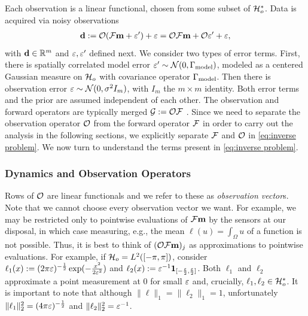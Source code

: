 \documentclass{amsart}
\numberwithin{equation}{section}
\begin{document}

Each observation is a linear functional, chosen from some subset of
$\mathcal{H}_o^{*}$. Data is acquired via noisy observations
\begin{align}\label{eq:inverse problem}
  \mathbf{d} := \mathcal{O} (\mathcal{F} \mathbf{m} + \varepsilon') + \varepsilon = \mathcal{O} \mathcal{F} \mathbf{m} + \mathcal{O} \varepsilon' + \varepsilon,
\end{align}
with $\mathbf{d} \in \mathbb{R}^m$ and $\varepsilon, \varepsilon'$ defined next. We consider two
types of error terms. First, there is spatially correlated model error
$\varepsilon' \sim \mathcal{N}(0,\Gamma_{\textup{model}})$, modeled as a centered Gaussian
measure on $\mathcal{H}_o$ with covariance operator $\Gamma_{\textup{model}}$. Then there is
observation error $\varepsilon \sim \mathcal{N}(0, \sigma^2 I_m)$, with $I_m$ the
$m \times m$ identity. Both error terms and the prior are assumed
independent of each other. The observation and forward operators are
typically merged $\mathcal{G} := \mathcal{O} \mathcal{F}$
\cite{AlexanderianGloorGhattas14}. Since we need to separate the
observation operator $\mathcal{O}$ from the forward operator $\mathcal{F}$ in order
to carry out the analysis in the following sections, we explicitly
separate $\mathcal{F}$ and $\mathcal{O}$ in \eqref{eq:inverse problem}. We now turn
to understand the terms present in \eqref{eq:inverse problem}.


\subsubsection{Dynamics and Observation Operators}\label{subsec:dynamics}
Rows of $\mathcal{O}$ are linear functionals and we refer to these as {\it
  observation vector}s. Note that we cannot choose every observation
vector we want. For example, we may be restricted only to pointwise
evaluations of $\mathcal{F} \mathbf{m}$ by the sensors at our disposal, in which
case measuring, e.g., the mean $\ell(u) = \int_{\Omega}u$ of a
function is not possible. Thus, it is best to think of $(\mathcal{O} \mathcal{F}
\mathbf{m})_j$ as approximations to pointwise evaluations. For example, if
$\mathcal{H}_o = L^2([-\pi, \pi])$, consider $\ell_1(x) := (2\pi
\varepsilon)^{-\frac{1}{2}}\exp(-\frac{x^2}{2\varepsilon^2})$ and $\ell_2(x)
:=\varepsilon^{-1}\mathbf{1}_{[-\frac{\varepsilon}{2}, \frac{\varepsilon}{2}]}$. Both
$\ell_1$ and $\ell_2$ approximate a point measurement at $0$ for small
$\varepsilon$ and, crucially, $\ell_1, \ell_2 \in \mathcal{H}_o^*$. It is important
to note that although $\|\ell\|_1 = \|\ell_2\|_1=1$, unfortunately
$\|\ell_1\|_2^2 = (4\pi \varepsilon)^{-\frac{1}{2}}$ and $\|\ell_2\|_2^2 =
\varepsilon^{-1}$.
\end{document}
